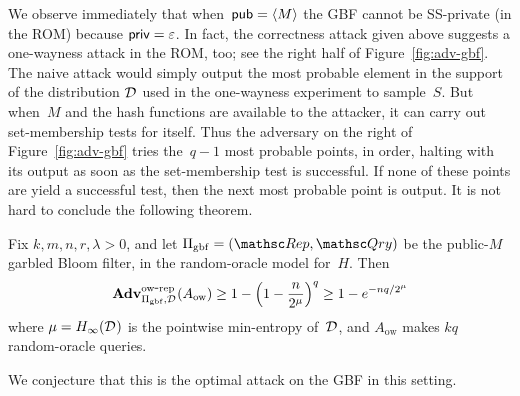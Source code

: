 We observe immediately that when~${\sf pub}=\langle M \rangle$ the GBF cannot be SS-private (in the ROM) because ${\sf priv}=\varepsilon$.  In fact, the correctness attack given above suggests a one-wayness attack in the ROM, too; see the right half of Figure~\ref{fig:adv-gbf}.   The naive attack would simply output the most probable element in the support of the distribution $\mathcal{D}_{}^{}$ used in the one-wayness experiment to sample~$S$.  But when~$M$ and the hash functions are available to the attacker, it can carry out set-membership tests for itself.  Thus the adversary on the right of Figure~\ref{fig:adv-gbf} tries the~$q-1$ most probable points, in order, halting with its output as soon as the set-membership test is successful.  If none of these points are yield a successful test, then the next most probable point is output.  It is not hard to conclude the following theorem.

\begin{theorem}
Fix $k,m,n,r,\lambda>0$, and let $\setprim_{\mathrm{gbf}}=(\Rep, \Qry)$ be the public-$M$ garbled Bloom filter, in the random-oracle model for~$H$.  Then 
\[
\mathrm{\mathbf{Adv}}^{\mathrm{ow\mbox{-}rep}}_{\Pi_{\mathrm{gbf}},\mathcal{D}_{}^{}}(A_{\mathrm{ow}}) \geq 1 - \left(1-\frac{n}{2^{\mu}} \right)^{q} \geq 1 - e^{-nq/2^\mu}
\]
 where $\mu = H_\infty(\mathcal{D}_{}^{})$ is the pointwise min-entropy of~$\mathcal{D}_{}^{}$, and $A_{\mathrm{ow}}$ makes $kq$ random-oracle queries.
\end{theorem}
\noindent
We conjecture that this is the optimal attack on the GBF in this setting.

